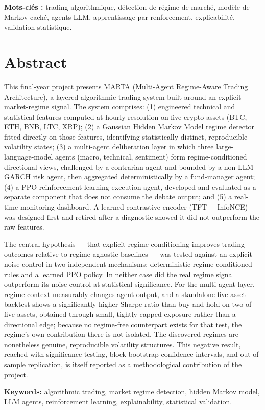 \textbf{Mots-clés :} trading algorithmique, détection de régime de marché, modèle de Markov caché, agents LLM, apprentissage par renforcement, explicabilité, validation statistique.

\chapter*{Abstract}

This final-year project presents MARTA (Multi-Agent Regime-Aware Trading Architecture), a layered algorithmic trading system built around an explicit market-regime signal. The system comprises: (1) engineered technical and statistical features computed at hourly resolution on five crypto assets (BTC, ETH, BNB, LTC, XRP); (2) a Gaussian Hidden Markov Model regime detector fitted directly on those features, identifying statistically distinct, reproducible volatility states; (3) a multi-agent deliberation layer in which three large-language-model agents (macro, technical, sentiment) form regime-conditioned directional views, challenged by a contrarian agent and bounded by a non-LLM GARCH risk agent, then aggregated deterministically by a fund-manager agent; (4) a PPO reinforcement-learning execution agent, developed and evaluated as a separate component that does not consume the debate output; and (5) a real-time monitoring dashboard. A learned contrastive encoder (TFT + InfoNCE) was designed first and retired after a diagnostic showed it did not outperform the raw features.

The central hypothesis --- that explicit regime conditioning improves trading outcomes relative to regime-agnostic baselines --- was tested against an explicit noise control in two independent mechanisms: deterministic regime-conditioned rules and a learned PPO policy. In neither case did the real regime signal outperform its noise control at statistical significance. For the multi-agent layer, regime context measurably changes agent output, and a standalone five-asset backtest shows a significantly higher Sharpe ratio than buy-and-hold on two of five assets, obtained through small, tightly capped exposure rather than a directional edge; because no regime-free counterpart exists for that test, the regime's own contribution there is not isolated. The discovered regimes are nonetheless genuine, reproducible volatility structures. This negative result, reached with significance testing, block-bootstrap confidence intervals, and out-of-sample replication, is itself reported as a methodological contribution of the project.

\textbf{Keywords:} algorithmic trading, market regime detection, hidden Markov model, LLM agents, reinforcement learning, explainability, statistical validation.
